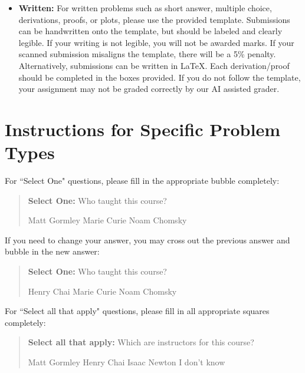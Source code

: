 \documentclass[11pt,addpoints,answers]{exam}
\newcommand{\blackcircle}{\tikz\draw[black,fill=black] (0,0) circle (1ex);}
\begin{document}
\begin{itemize}
\begin{itemize}
   \item \textbf{Written:} For written problems such as short answer, multiple choice, derivations, proofs, or plots, please use the provided template. Submissions can be handwritten onto the template, but should be labeled and clearly legible. If your writing is not legible, you will not be awarded marks. If your scanned submission misaligns the template, there will be a 5\% penalty. Alternatively, submissions can be written in LaTeX. 
   Each derivation/proof should be completed in the boxes provided. If you do not follow the template, your assignment may not be graded correctly by our AI assisted grader.
  \end{itemize}

\end{itemize}\clearpage

\section*{Instructions for Specific Problem Types}

For ``Select One" questions, please fill in the appropriate bubble completely:

\begin{quote}
\textbf{Select One:} Who taught this course?
    \begin{checkboxes}
     \CorrectChoice Matt Gormley
     \choice Marie Curie
     \choice Noam Chomsky
    \end{checkboxes}
\end{quote}

If you need to change your answer, you may cross out the previous answer and bubble in the new answer:

\begin{quote}
\textbf{Select One:} Who taught this course?
    {
    \begin{checkboxes}
     \CorrectChoice Henry Chai
     \choice Marie Curie \checkboxchar{\xcancel{\blackcircle}{}}
     \choice Noam Chomsky
    \end{checkboxes}
    }
\end{quote}

For ``Select all that apply" questions, please fill in all appropriate squares completely:

\begin{quote}
\textbf{Select all that apply:} Which are instructors for this course?
    {%
    \checkboxchar{$\Box$} \checkedchar{$\blacksquare$} %
    \begin{checkboxes}
    \CorrectChoice Matt Gormley  
    \CorrectChoice Henry Chai
    \choice Isaac Newton
    \choice I don't know
    \end{checkboxes}
    }
\end{quote}
\end{document}
